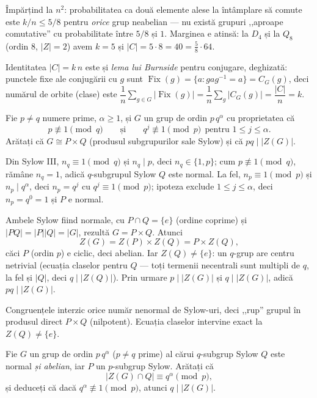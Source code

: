 \begin{obs}
Împărțind la $n^{2}$: probabilitatea ca două elemente alese la
întâmplare să comute este $k/n\le 5/8$ pentru \emph{orice} grup
neabelian --- nu există grupuri ,,aproape comutative'' cu probabilitate
între $5/8$ și $1$. Marginea e atinsă: la $D_{4}$ și la $Q_{8}$
(ordin $8$, $|Z|=2$) avem $k=5$ și $|C|=5\cdot 8=40=\tfrac58\cdot 64$.

Identitatea $|C|=k\,n$ este și \emph{lema lui Burnside} pentru
conjugare, deghizată: punctele fixe ale conjugării cu $g$ sunt
$\operatorname{Fix}(g)=\{a:gag^{-1}=a\}=C_{G}(g)$, deci numărul de orbite
(clase) este $\dfrac{1}{n}\sum_{g\in G}|\operatorname{Fix}(g)|
=\dfrac{1}{n}\sum_{g}|C_{G}(g)|=\dfrac{|C|}{n}=k$.
\end{obs}

\begin{problema}
Fie $p\neq q$ numere prime, $\alpha\ge 1$, și $G$ un grup de ordin
$p\,q^{\alpha}$ cu proprietatea că
\[
  p\not\equiv 1\pmod q\qquad\text{și}\qquad q^{j}\not\equiv 1\pmod p
  \ \ \text{pentru }1\le j\le\alpha .
\]
Arătați că $G\cong P\times Q$ (produsul subgrupurilor sale Sylow)
și că $pq\mid|Z(G)|$.
\end{problema}

\begin{solutie}
Din Sylow III, $n_{q}\equiv 1\pmod q$ și $n_{q}\mid p$, deci
$n_{q}\in\{1,p\}$; cum $p\not\equiv 1\pmod q$, rămâne $n_{q}=1$, adică
$q$-subgrupul Sylow $Q$ este normal. La fel, $n_{p}\equiv 1\pmod p$ și
$n_{p}\mid q^{\alpha}$, deci $n_{p}=q^{j}$ cu $q^{j}\equiv 1\pmod p$; ipoteza
exclude $1\le j\le\alpha$, deci $n_{p}=q^{0}=1$ și $P$ e normal.

Ambele Sylow fiind normale, cu $P\cap Q=\{e\}$ (ordine coprime) și
$|PQ|=|P||Q|=|G|$, rezultă $G=P\times Q$. Atunci
\[
  Z(G)=Z(P)\times Z(Q)=P\times Z(Q),
\]
căci $P$ (ordin $p$) e ciclic, deci abelian. Iar $Z(Q)\neq\{e\}$: un
$q$-grup are centru netrivial (ecuația claselor pentru $Q$ --- toți
termenii necentrali sunt multipli de $q$, la fel și $|Q|$, deci
$q\mid|Z(Q)|$). Prin urmare $p\mid|Z(G)|$ și $q\mid|Z(G)|$, adică
$pq\mid|Z(G)|$.
\end{solutie}

\begin{obs}
Congruențele interzic orice număr nenormal de Sylow-uri, deci
,,rup'' grupul în produsul direct $P\times Q$ (nilpotent). Ecuația
claselor intervine exact la $Z(Q)\neq\{e\}$.
\end{obs}

\begin{problema}
Fie $G$ un grup de ordin $p\,q^{\alpha}$ ($p\neq q$ prime) al cărui
$q$-subgrup Sylow $Q$ este normal \emph{și abelian}, iar $P$ un
$p$-subgrup Sylow. Arătați că
\[
  |Z(G)\cap Q|\equiv q^{\alpha}\pmod p,
\]
și deduceți că dacă $q^{\alpha}\not\equiv 1\pmod p$, atunci
$q\mid|Z(G)|$.
\end{problema}

